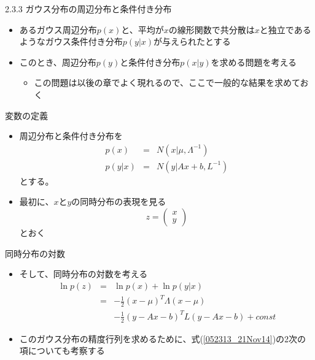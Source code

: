 \begin{frame}{2.3.3 ガウス分布の周辺分布と条件付き分布}
 \begin{itemize}
  \item あるガウス周辺分布$p(x)$と、平均が$x$の線形関数で共分散は$x$と独立であるようなガウス条件付き分布$p(y|x)$が与えられたとする
  \item このとき、周辺分布$p(y)$と条件付き分布$p(x|y)$を求める問題を考える
        \begin{itemize}
         \item この問題は以後の章でよく現れるので、ここで一般的な結果を求めておく
        \end{itemize}
 \end{itemize}
\end{frame}

\begin{frame}{変数の定義}
 \begin{itemize}
  \item 周辺分布と条件付き分布を
        \begin{eqnarray}
         p(x) &=& N(x|\mu , \Lambda^{-1})\\
         p(y|x) &=& N(y|Ax+b, L^{-1})
        \end{eqnarray}
        とする。
  \item 最初に、$x$と$y$の同時分布の表現を見る
        \begin{equation}
         z = \begin{pmatrix}
              x \\
              y
             \end{pmatrix}
        \end{equation}
        とおく
 \end{itemize}
\end{frame}

\begin{frame}{同時分布の対数}
 \begin{itemize}
  \item そして、同時分布の対数を考える
        \begin{eqnarray}
         \ln p(z) &=& \ln p(x) + \ln p(y|x) \nonumber \\
         &= & -\frac{1}{2}(x-\mu)^T\Lambda(x-\mu) \nonumber \\
         &&-\frac{1}{2}(y-Ax-b)^TL(y-Ax-b)+const\label{052313_21Nov14}
        \end{eqnarray}
  \item このガウス分布の精度行列を求めるために、式(\ref{052313_21Nov14})の2次の項についても考察する
 \end{itemize}
\end{frame}

